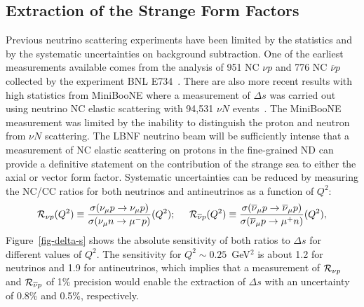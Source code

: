 \subsection{Extraction of the Strange Form Factors}
Previous neutrino scattering experiments have been limited by the
statistics and by the systematic uncertainties on background
subtraction.  One of the earliest measurements available comes from
the analysis of 951 NC $\nu p$ and 776 NC $\overline{\nu}p$ collected
by the experiment BNL
E734~\cite{Ahrens:1986xe,Garvey:1992cg,Alberico:1998qw}. There are
also more recent results with high statistics from MiniBooNE where a
measurement of $\Delta s$ was carried out using neutrino NC elastic
scattering with 94,531 $\nu N$ events~\cite{AguilarArevalo:2010cx}.
The MiniBooNE measurement was limited by the inability to distinguish
the proton and neutron from $\nu N$ scattering. The LBNF neutrino beam
will be sufficiently intense that a measurement of NC elastic
scattering on protons  
in the fine-grained ND can provide a definitive
statement on the contribution of the strange sea to either the axial
or vector form factor.
Systematic uncertainties can be reduced by measuring the NC/CC ratios
for both neutrinos and antineutrinos as a function of $Q^2$:
\begin{equation}
{\cal R}_{\nu p} (Q^2) \equiv \frac{\sigma(\nu_\mu p \to \nu_\mu p)}{\sigma(\nu_\mu n \to \mu^- p)}(Q^2); \;\;\;\;\;
{\cal R}_{\overline{\nu} p} (Q^2) \equiv \frac{\sigma(\overline{\nu}_\mu p \to \overline{\nu}_\mu p)}{\sigma(\overline{\nu}_\mu p \to \mu^+ n)}(Q^2),
\end{equation}
Figure~\ref{fig-delta-s} shows the absolute sensitivity of both ratios
to $\Delta s$ for different values of $Q^2$. The sensitivity for
$Q^2\sim0.25$~GeV$^2$ is about 1.2 for neutrinos and 1.9 for
antineutrinos, which implies that a measurement of ${\cal R}_{\nu p}$
and ${\cal R}_{\overline{\nu} p}$ of 1\% precision would enable the
extraction of $\Delta s$ with an uncertainty of 0.8\% and 0.5\%,
respectively.
%
%
